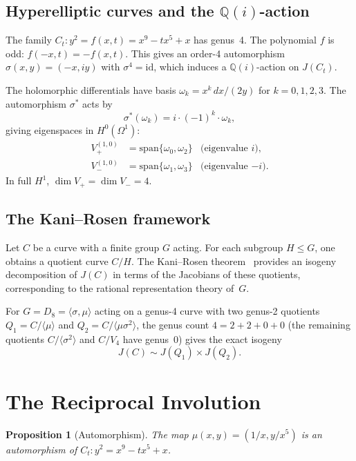 \documentclass[11pt]{article}
\theoremstyle{plain}
\newtheorem{proposition}[theorem]{Proposition}
\theoremstyle{definition}
\theoremstyle{remark}
\newcommand{\Q}{\mathbb{Q}}
\begin{document}
\subsection{Hyperelliptic curves and the $\Q(i)$-action}

The family $C_t\colon y^2 = f(x,t) = x^9 - tx^5 + x$ has genus~4.
The polynomial $f$ is odd: $f(-x,t) = -f(x,t)$.  This gives an
order-4 automorphism $\sigma(x,y) = (-x, iy)$ with $\sigma^4 = \mathrm{id}$,
which induces a $\Q(i)$-action on $J(C_t)$.

The holomorphic differentials have basis
$\omega_k = x^k\,dx/(2y)$ for $k = 0,1,2,3$.
The automorphism $\sigma^*$ acts by
\[
  \sigma^*(\omega_k) = i \cdot (-1)^k \cdot \omega_k,
\]
giving eigenspaces in $H^0(\Omega^1)$:
\begin{align*}
  V_+^{(1,0)} &= \mathrm{span}\{\omega_0, \omega_2\}
    &\text{(eigenvalue } i\text{)},\\
  V_-^{(1,0)} &= \mathrm{span}\{\omega_1, \omega_3\}
    &\text{(eigenvalue } {-i}\text{)}.
\end{align*}
In full $H^1$, $\dim V_+ = \dim V_- = 4$.

\subsection{The Kani--Rosen framework}

Let $C$ be a curve with a finite group $G$ acting.
For each subgroup $H \leq G$, one obtains a quotient curve $C/H$.
The Kani--Rosen theorem~\cite{KR89} provides an isogeny decomposition
of $J(C)$ in terms of the Jacobians of these quotients,
corresponding to the rational representation theory of~$G$.

For $G = D_8 = \langle \sigma, \mu \rangle$ acting on a genus-4 curve
with two genus-2 quotients $Q_1 = C/\langle\mu\rangle$ and
$Q_2 = C/\langle\mu\sigma^2\rangle$, the genus count
$4 = 2 + 2 + 0 + 0$ (the remaining quotients $C/\langle\sigma^2\rangle$
and $C/V_4$ have genus~0) gives the exact isogeny
\[
  J(C) \sim J(Q_1) \times J(Q_2).
\]

\section{The Reciprocal Involution}
\label{sec:involution}

\begin{proposition}[Automorphism]\label{prop:mu}
The map $\mu(x,y) = (1/x, y/x^5)$ is an automorphism of
$C_t\colon y^2 = x^9 - tx^5 + x$.
\end{proposition}
\end{document}

